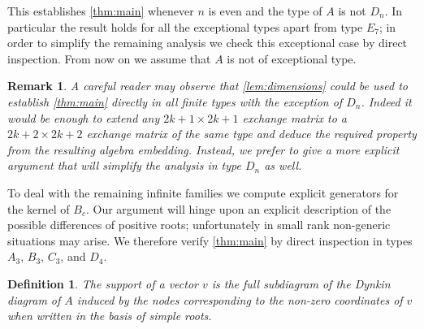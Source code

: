 \documentclass[11pt]{amsart}
\newtheorem{definition}[theorem]{Definition}
\newtheorem{remark}[theorem]{Remark}
\numberwithin{equation}{section}
\numberwithin{figure}{section}
\begin{document}
  This establishes \cref{thm:main} whenever $n$ is even and the type of $A$ is not $D_n$.
  In particular the result holds for all the exceptional types apart from type $E_7$; in order to simplify the remaining analysis we check this exceptional case by direct inspection.
  From now on we assume that $A$ is not of exceptional type.

  \begin{remark}
    \label{rk:induction}
    A careful reader may observe that \cref{lem:dimensions} could be used to establish \cref{thm:main} directly in all finite types with the exception of $D_n$. 
    Indeed it would be enough to extend any $2k+1 \times 2k+1$ exchange matrix to a $2k+2\times2k+2$ exchange matrix of the same type and deduce the required property from the resulting algebra embedding.
    Instead, we prefer to give a more explicit argument that will simplify the analysis in type $D_n$ as well.
  \end{remark}

  To deal with the remaining infinite families we compute explicit generators for the kernel of $B_c$. 
  Our argument will hinge upon an explicit description of the possible differences of positive roots; unfortunately in small rank non-generic situations may arise.
  We therefore verify \cref{thm:main} by direct inspection in types $A_3$, $B_3$, $C_3$, and $D_4$.

  \begin{definition}
    The \emph{support} of a vector $v$ is the full subdiagram of the Dynkin diagram of $A$ induced by the nodes corresponding to the non-zero coordinates of $v$ when written in the basis of simple roots.
  \end{definition}
\end{document}
